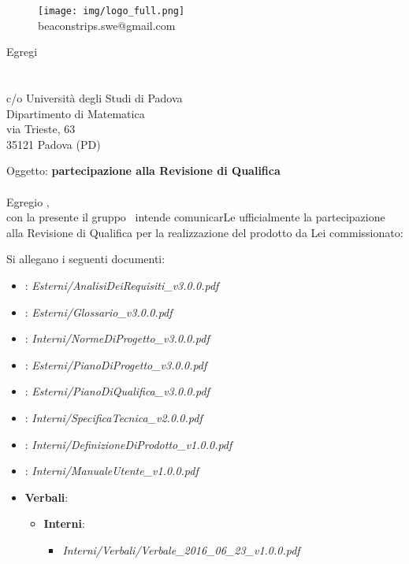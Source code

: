 \documentclass[a4paper]{article}
\newcommand{\spazio}{\vspace{1.5cm}}
\begin{document}
\spazio
\begin{figure}[!h]
	\centering
	\texttt{[image: img/logo\_full.png]} \\
	beaconstrips.swe@gmail.com
\end{figure}

\spazio

\begin{flushright}
\date{2016-08-17}
Egregi \\
\COMMITTENTE \\
\CARDIN \\
c/o Università degli Studi di Padova  \\
Dipartimento di Matematica \\
via Trieste, 63 \\
35121 Padova (PD)
\end{flushright}
\spazio

Oggetto: \textbf{partecipazione alla Revisione di Qualifica} \\ \\
Egregio \COMMITTENTE,\\
con la presente il gruppo \AUTORE \ intende comunicarLe ufficialmente la partecipazione alla Revisione di Qualifica per la realizzazione del prodotto da Lei commissionato: \\

Si allegano i seguenti documenti:
\begin{itemize}
	\item \textbf{\ARdocRQ}: \textit{Esterni/AnalisiDeiRequisiti\_v3.0.0.pdf}
	\item \textbf{\GldocRQ}: \textit{Esterni/Glossario\_v3.0.0.pdf}
	\item \textbf{\NPdocRQ}: \textit{Interni/NormeDiProgetto\_v3.0.0.pdf}
	\item \textbf{\PPdocRQ}: \textit{Esterni/PianoDiProgetto\_v3.0.0.pdf}
	\item \textbf{\PQdocRQ}: \textit{Esterni/PianoDiQualifica\_v3.0.0.pdf}
	\item \textbf{\SFdocRQ}: \textit{Interni/SpecificaTecnica\_v2.0.0.pdf}
	\item \textbf{\DPdocRQ}: \textit{Interni/DefinizioneDiProdotto\_v1.0.0.pdf}
	\item \textbf{\MUdocRQ}: \textit{Interni/ManualeUtente\_v1.0.0.pdf}
	\item \textbf{Verbali}:
		\begin{itemize}
			\item \textbf{Interni}:
				\begin{itemize}
					\item \textit{Interni/Verbali/Verbale\_2016\_06\_23\_v1.0.0.pdf}
				\end{itemize}
		\end{itemize}
	\end{itemize}
\spazio
\end{document}
